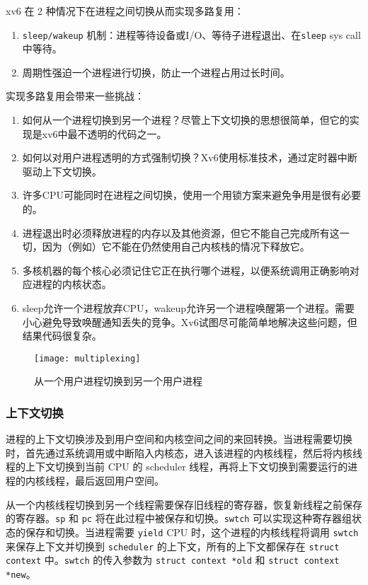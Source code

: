 xv6 在 2 种情况下在进程之间切换从而实现多路复用：

\begin{enumerate}
	\item \texttt{sleep/wakeup} 机制：进程等待设备或I/O、等待子进程退出、在\texttt{sleep} sys call中等待。
	\item 周期性强迫一个进程进行切换，防止一个进程占用过长时间。 
\end{enumerate}

实现多路复用会带来一些挑战：

\begin{enumerate}
	\item 如何从一个进程切换到另一个进程？尽管上下文切换的思想很简单，但它的实现是xv6中最不透明的代码之一。
	\item 如何以对用户进程透明的方式强制切换？Xv6使用标准技术，通过定时器中断驱动上下文切换。
	\item 许多CPU可能同时在进程之间切换，使用一个用锁方案来避免争用是很有必要的。
	\item 进程退出时必须释放进程的内存以及其他资源，但它不能自己完成所有这一切，因为（例如）它不能在仍然使用自己内核栈的情况下释放它。
	\item 多核机器的每个核心必须记住它正在执行哪个进程，以便系统调用正确影响对应进程的内核状态。
	\item sleep允许一个进程放弃CPU，wakeup允许另一个进程唤醒第一个进程。需要小心避免导致唤醒通知丢失的竞争。Xv6试图尽可能简单地解决这些问题，但结果代码很复杂。  
\end{enumerate}

\begin{figure}[!htb]
	\centering
	\texttt{[image: multiplexing]}
	\caption{从一个用户进程切换到另一个用户进程}
	\label{fig:multiplexing}
\end{figure}

\subsubsection{上下文切换}

进程的上下文切换涉及到用户空间和内核空间之间的来回转换。当进程需要切换时，首先通过系统调用或中断陷入内核态，进入该进程的内核线程，然后将内核线程的上下文切换到当前 CPU 的 scheduler 线程，再将上下文切换到需要运行的进程的内核线程，最后返回用户空间。

从一个内核线程切换到另一个线程需要保存旧线程的寄存器，恢复新线程之前保存的寄存器。\texttt{sp} 和 \texttt{pc} 将在此过程中被保存和切换。\texttt{swtch} 可以实现这种寄存器组状态的保存和切换。当进程需要 \texttt{yield} CPU 时，这个进程的内核线程将调用 \texttt{swtch} 来保存上下文并切换到 \texttt{scheduler} 的上下文，所有的上下文都保存在 \texttt{struct context} 中。\texttt{swtch} 的传入参数为 \texttt{struct context *old} 和 \texttt{struct context *new}。


